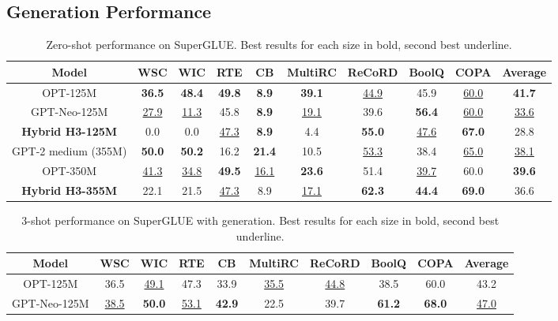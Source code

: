 \documentclass{article}
\newcommand{\hthree}{\textsc{H3}\xspace}
\begin{document}
\subsection{Generation Performance\label{sec:app_generation}}
\begin{table}[h]
\scriptsize
    \centering
\caption{\label{table:superglue_zeroshot} Zero-shot performance on SuperGLUE. Best results for each size in bold, second best underline. }
{
        \begin{tabular}{@{}|c|cccccccc|c|@{}}
            \hline
Model & WSC & WIC & RTE & CB & MultiRC & ReCoRD & BoolQ & COPA & Average \\ \hline
OPT-125M & \textbf{36.5} & \textbf{48.4} & \textbf{49.8} & \textbf{8.9} & \textbf{39.1} & \underline{44.9} & 45.9 & \underline{60.0} & \textbf{41.7} \\
        GPT-Neo-125M & \underline{27.9} & \underline{11.3} & 45.8 & \textbf{8.9} & \underline{19.1} & 39.6 & \textbf{56.4} & \underline{60.0} & \underline{33.6} \\
\textbf{Hybrid \hthree-125M} & 0.0 & 0.0 & \underline{47.3} & \textbf{8.9} & 4.4 & \textbf{55.0} & \underline{47.6} & \textbf{67.0} & 28.8 \\ \hline GPT-2 medium (355M) & \textbf{50.0} & \textbf{50.2} & 16.2 & \textbf{21.4} & 10.5 & \underline{53.3} & 38.4 & \underline{65.0} & \underline{38.1} \\
OPT-350M & \underline{41.3} & \underline{34.8} & \textbf{49.5} & \underline{16.1} & \textbf{23.6} & 51.4 & \underline{39.7} & 60.0 & \textbf{39.6} \\
        \textbf{Hybrid \hthree-355M} & 22.1 & 21.5 & \underline{47.3} & 8.9 & \underline{17.1} & \textbf{62.3} & \textbf{44.4} & \textbf{69.0} & 36.6 \\ \hline
\end{tabular}
    }
\end{table} \begin{table}[h]
\scriptsize
    \centering
\caption{\label{table:superglue_fewshot} 3-shot performance on SuperGLUE with generation. Best results for each size in bold, second best underline. }
{
        \begin{tabular}{@{}|c|cccccccc|c|@{}}
            \hline
Model & WSC & WIC & RTE & CB & MultiRC & ReCoRD & BoolQ & COPA & Average \\ \hline
OPT-125M & 36.5 & \underline{49.1} & 47.3 & 33.9 & \underline{35.5} & \underline{44.8} & 38.5 & 60.0 & 43.2 \\
        GPT-Neo-125M & \underline{38.5} & \textbf{50.0} & \underline{53.1} & \textbf{42.9} & 22.5 & 39.7 & \textbf{61.2} & \textbf{68.0} & \underline{47.0} \\

\end{tabular}}
\end{table}
\end{document}
